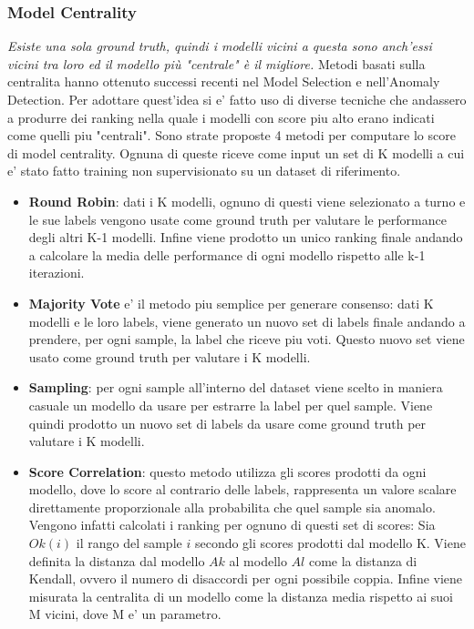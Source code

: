 \subsubsection{Model Centrality}
\textit{Esiste una sola ground truth, quindi i modelli vicini a questa sono anch'essi vicini tra loro ed il modello più "centrale" è il migliore.}
Metodi basati sulla centralita hanno ottenuto successi recenti nel Model Selection e nell'Anomaly Detection. 
Per adottare quest'idea si e' fatto uso di diverse tecniche che andassero a produrre dei ranking nella quale i modelli con score piu alto erano indicati come quelli piu "centrali".
Sono strate proposte 4 metodi per computare lo score di model centrality. Ognuna di queste riceve come input un set di K modelli a cui e' stato fatto training non supervisionato su un dataset di riferimento. 
\begin{itemize}
	\item \textbf{Round Robin}: dati i K modelli, ognuno di questi viene selezionato a turno e le sue labels vengono usate come ground truth per valutare le performance degli altri K-1 modelli. Infine viene prodotto un unico ranking finale andando a calcolare la media delle performance di ogni modello rispetto alle k-1 iterazioni. 
	\item \textbf{Majority Vote} e' il metodo piu semplice per generare consenso: dati K modelli e le loro labels, viene generato un nuovo set di labels finale andando a prendere, per ogni sample, la label che riceve piu voti. Questo nuovo set viene usato come ground truth per valutare i K modelli.
	\item \textbf{Sampling}: per ogni sample all'interno del dataset viene scelto in maniera casuale un modello da usare per estrarre la label per quel sample. Viene quindi prodotto un nuovo set di labels da usare come ground truth per valutare i K modelli.
	\item \textbf{Score Correlation}: questo metodo utilizza gli scores prodotti da ogni modello, dove lo score al contrario delle labels, rappresenta un valore scalare direttamente proporzionale alla probabilita che quel sample sia anomalo. Vengono infatti calcolati i ranking per ognuno di questi set di scores: Sia $Ok(i)$ il rango del sample $i$ secondo gli scores prodotti dal modello K. Viene definita la distanza dal modello $Ak$ al modello $Al$ come la distanza di Kendall, ovvero il numero di disaccordi per ogni possibile coppia. Infine viene misurata la centralita di un modello come la distanza media rispetto ai suoi M vicini, dove M e' un parametro.
\end{itemize}

